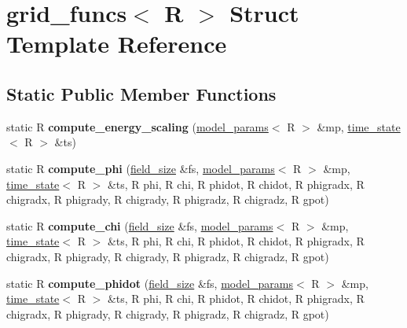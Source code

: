 \hypertarget{structgrid__funcs}{
\section{grid\_\-funcs$<$ R $>$ Struct Template Reference}
\label{structgrid__funcs}
}
\subsection*{Static Public Member Functions}
\begin{DoxyCompactItemize}
\item 
\hypertarget{structgrid__funcs_ae3db013f110ad8e23b38207a7e3c88c5}{
static R {\bfseries compute\_\-energy\_\-scaling} (\hyperlink{structmodel__params}{model\_\-params}$<$ R $>$ \&mp, \hyperlink{structtime__state}{time\_\-state}$<$ R $>$ \&ts)}
\label{structgrid__funcs_ae3db013f110ad8e23b38207a7e3c88c5}

\item 
\hypertarget{structgrid__funcs_ae9184a5f3f25cf912540747a6a12af5d}{
static R {\bfseries compute\_\-phi} (\hyperlink{structfield__size}{field\_\-size} \&fs, \hyperlink{structmodel__params}{model\_\-params}$<$ R $>$ \&mp, \hyperlink{structtime__state}{time\_\-state}$<$ R $>$ \&ts, R phi, R chi, R phidot, R chidot, R phigradx, R chigradx, R phigrady, R chigrady, R phigradz, R chigradz, R gpot)}
\label{structgrid__funcs_ae9184a5f3f25cf912540747a6a12af5d}

\item 
\hypertarget{structgrid__funcs_a4be6b2b34635f0b88e1ddde0107e76de}{
static R {\bfseries compute\_\-chi} (\hyperlink{structfield__size}{field\_\-size} \&fs, \hyperlink{structmodel__params}{model\_\-params}$<$ R $>$ \&mp, \hyperlink{structtime__state}{time\_\-state}$<$ R $>$ \&ts, R phi, R chi, R phidot, R chidot, R phigradx, R chigradx, R phigrady, R chigrady, R phigradz, R chigradz, R gpot)}
\label{structgrid__funcs_a4be6b2b34635f0b88e1ddde0107e76de}

\item 
\hypertarget{structgrid__funcs_accc9841aa0728d980fc68c89def02113}{
static R {\bfseries compute\_\-phidot} (\hyperlink{structfield__size}{field\_\-size} \&fs, \hyperlink{structmodel__params}{model\_\-params}$<$ R $>$ \&mp, \hyperlink{structtime__state}{time\_\-state}$<$ R $>$ \&ts, R phi, R chi, R phidot, R chidot, R phigradx, R chigradx, R phigrady, R chigrady, R phigradz, R chigradz, R gpot)}
\label{structgrid__funcs_accc9841aa0728d980fc68c89def02113}


\end{DoxyCompactItemize}
